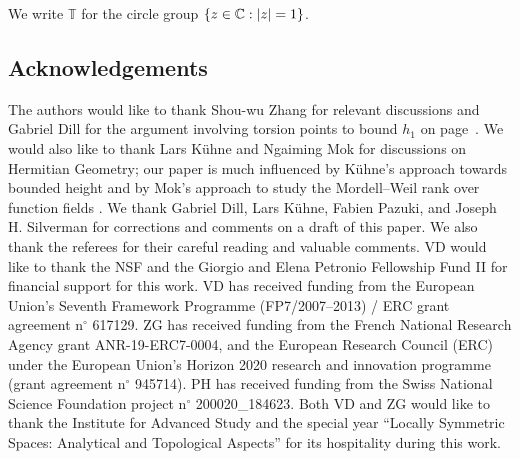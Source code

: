 We write $\mathbb{T}$ for the circle group $\{z\in {\mathbb{C}} : |z|=1\}$.

\subsection*{Acknowledgements} The authors would like to thank
Shou-wu Zhang for relevant discussions and Gabriel Dill for the
argument involving torsion points to bound $h_1$ on
page~\pageref{page:boundh1}. 
We would also like
to thank Lars K\"uhne and Ngaiming Mok  for discussions on Hermitian Geometry; our paper 
is much influenced by K\"uhne's approach towards bounded height
\cite{kuehne:semiabelianbhc}
and by Mok's approach to study the Mordell--Weil rank over function
fields \cite{Mok11Form}.
We thank Gabriel Dill, Lars K\"uhne, Fabien Pazuki, and Joseph H. Silverman for corrections and comments
on a draft of this paper. 
We also thank the referees for their careful reading and valuable comments. 
VD would like
to thank the NSF and the Giorgio and Elena Petronio Fellowship Fund II
for financial support for this work. VD has received funding from the European Union's Seventh Framework Programme (FP7/2007--2013) / ERC grant agreement n$^\circ$ 617129. ZG has received
funding from the French National Research Agency grant
ANR-19-ERC7-0004, and the European Research Council (ERC) under the
European Union's Horizon 2020 research and innovation programme (grant
agreement n$^\circ$ 945714). PH has received funding
from the Swiss National Science Foundation project n$^\circ$ 200020\_184623.
Both VD and ZG would like to
thank the Institute for Advanced Study and the special year ``Locally
Symmetric Spaces: Analytical and Topological Aspects'' for its
hospitality during this work.


